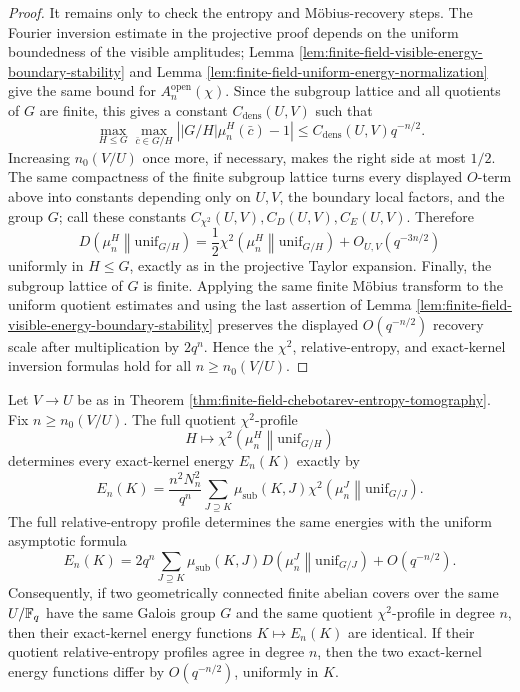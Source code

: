 \begin{proof}
It remains only to check the entropy and M\"obius-recovery steps.  The Fourier inversion estimate in the projective proof depends on the uniform boundedness of the visible amplitudes; Lemma \ref{lem:finite-field-visible-energy-boundary-stability} and Lemma \ref{lem:finite-field-uniform-energy-normalization} give the same bound for \(A_n^{\mathrm{open}}(\chi)\).  Since the subgroup lattice and all quotients of \(G\) are finite, this gives a constant \(C_{\mathrm{dens}}(U,V)\) such that
\[
\max_{H\le G}\max_{\bar c\in G/H}\left||G/H|\mu_n^H(\bar c)-1\right|
\le C_{\mathrm{dens}}(U,V)q^{-n/2}.
\]
Increasing \(n_0(V/U)\) once more, if necessary, makes the right side at most \(1/2\).  The same compactness of the finite subgroup lattice turns every displayed \(O\)-term above into constants depending only on \(U,V\), the boundary local factors, and the group \(G\); call these constants \(C_{\chi^2}(U,V),C_D(U,V),C_E(U,V)\).  Therefore
\[
D\!\left(\mu_n^H\middle\|\mathrm{unif}_{G/H}\right)
=\frac12\chi^2\!\left(\mu_n^H\middle\|\mathrm{unif}_{G/H}\right)+O_{U,V}(q^{-3n/2})
\]
uniformly in \(H\le G\), exactly as in the projective Taylor expansion.  Finally, the subgroup lattice of \(G\) is finite.  Applying the same finite M\"obius transform to the uniform quotient estimates and using the last assertion of Lemma \ref{lem:finite-field-visible-energy-boundary-stability} preserves the displayed \(O(q^{-n/2})\) recovery scale after multiplication by \(2q^n\).  Hence the \(\chi^2\), relative-entropy, and exact-kernel inversion formulas hold for all \(n\ge n_0(V/U)\).
\end{proof}

\begin{corollary}\label{cor:finite-field-quotient-profile-rigidity}
Let \(V\to U\) be as in Theorem \ref{thm:finite-field-chebotarev-entropy-tomography}. Fix \(n\ge n_0(V/U)\). The full quotient \(\chi^2\)-profile
\[
H\longmapsto
\chi^2\!\left(\mu_n^H\middle\|\mathrm{unif}_{G/H}\right)
\]
determines every exact-kernel energy \(E_n(K)\) exactly by
\[
E_n(K)=\frac{n^2N_n^2}{q^n}
\sum_{J\supseteq K}\mu_{\mathrm{sub}}(K,J)
\chi^2\!\left(\mu_n^J\middle\|\mathrm{unif}_{G/J}\right).
\]
The full relative-entropy profile determines the same energies with the uniform asymptotic formula
\[
E_n(K)=2q^n\sum_{J\supseteq K}\mu_{\mathrm{sub}}(K,J)
D\!\left(\mu_n^J\middle\|\mathrm{unif}_{G/J}\right)+O(q^{-n/2}).
\]
Consequently, if two geometrically connected finite \etale{} abelian covers over the same \(U/\mathbb{F}_q\) have the same Galois group \(G\) and the same quotient \(\chi^2\)-profile in degree \(n\), then their exact-kernel energy functions \(K\mapsto E_n(K)\) are identical. If their quotient relative-entropy profiles agree in degree \(n\), then the two exact-kernel energy functions differ by \(O(q^{-n/2})\), uniformly in \(K\).
\end{corollary}

